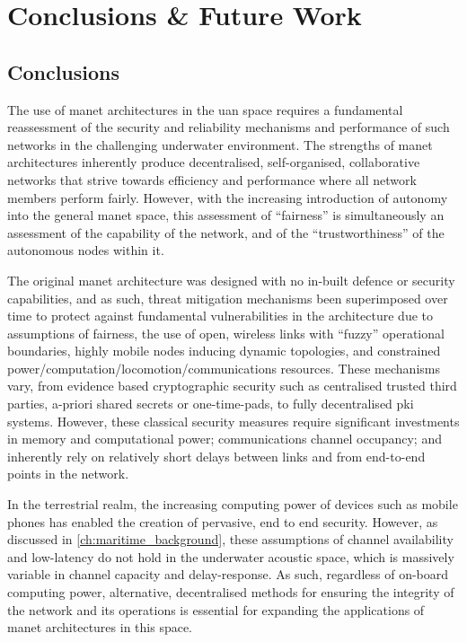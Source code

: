 \def\ChapterTitle{Conclusions \& Future Work}

	\chapter{\ChapterTitle}
	\label{ch:conclusion}
	\lhead{Chapter \thechapter. \emph{\ChapterTitle}} %

\section{Conclusions}

The use of \gls{manet} architectures in the \gls{uan} space requires a fundamental reassessment of the security and reliability mechanisms and performance of such networks in the challenging underwater environment.
The strengths of \gls{manet} architectures inherently produce decentralised, self-organised, collaborative networks that strive towards efficiency and performance where all network members perform fairly.
However, with the increasing introduction of autonomy into the general \gls{manet} space, this assessment of ``fairness'' is simultaneously an assessment of the capability of the network, and of the ``trustworthiness'' of the autonomous nodes within it.

The original \gls{manet} architecture was designed with no in-built defence or security capabilities, and as such, threat mitigation mechanisms been superimposed over time to protect against fundamental vulnerabilities in the architecture due to assumptions of fairness, the use of open, wireless links with ``fuzzy'' operational boundaries, highly mobile nodes inducing dynamic topologies, and constrained power/computation/locomotion/communications resources.
These mechanisms vary, from evidence based cryptographic security such as centralised trusted third parties, a-priori shared secrets or one-time-pads, to fully decentralised \gls{pki} systems.
However, these classical security measures require significant investments in memory and computational power; communications channel occupancy; and inherently rely on relatively short delays between links and from end-to-end points in the network.

In the terrestrial realm, the increasing computing power of devices such as mobile phones has enabled the creation of pervasive, end to end security. 
However, as discussed in \autoref{ch:maritime_background}, these assumptions of channel availability and low-latency do not hold in the underwater acoustic space, which is massively variable in channel capacity and delay-response.
As such, regardless of on-board computing power, alternative, decentralised methods for ensuring the integrity of the network and its operations is essential for expanding the applications of \gls{manet} architectures in this space. 

